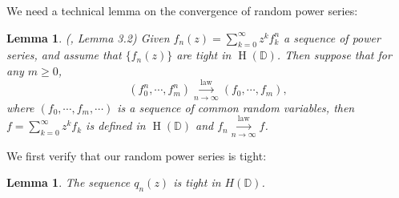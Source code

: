 \documentclass[12pt, reqno]{amsart}
\newtheorem{lemma}[theorem]{Lemma}
\theoremstyle{definition}
\theoremstyle{remark}
\numberwithin{equation}{section}
\begin{document}
We need a technical lemma on the convergence of random power series:
 
\begin{lemma}\label{lemma3.12345}(\cite{bordenave2021convergence}, Lemma 3.2)
Given $f_n(z)=\sum_{k=0}^\infty z^kf_k^n$ a sequence of power series, and assume that $\{f_n(z)\}$ are tight in $\operatorname{H}(\mathbb{D})$. Then suppose that for any $m\geq 0$,
\begin{equation}
    (f_0^n,\cdots,f_m^n)\overset{\text{law}}{\underset{n\to\infty}{\longrightarrow}}
 (f_0,\cdots,f_m),
\end{equation}
where $(f_0,\cdots,f_m,\cdots)$ is a sequence of common random variables, 
then $f=\sum_{k=0}^\infty z^k f_k$ is defined in $\operatorname{H}(\mathbb{D})$ and $f_n\overset{\text{law}}{\underset{n\to\infty}{\longrightarrow}} f$.
\end{lemma}


We first verify that our random power series is tight:

\begin{lemma}\label{tightnesslemma}
    The sequence $q_n(z)$ is tight in $H(\mathbb{D})$.
\end{lemma}
\end{document}
